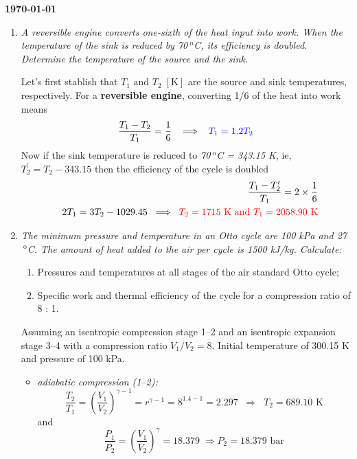 \documentclass[12pts,a4paper,amsmath,amssymb,floatfix]{article}%
\newcommand{\frc}{\displaystyle\frac}
\begin{document}
\begin{flushright}
{\bf \today}
\end{flushright}


\begin{enumerate}[label=\bfseries Example \arabic*]


\item {\it A reversible engine converts one-sixth of the heat input into work. When the temperature of the sink is reduced by 70$^{\text{ o}}$C, its efficiency is doubled. Determine the temperature of the source and the sink.}\label{Example_03_01}

Let's first stablish that $T_{1}\text{ and }T_{2}\;\left[\text{K}\right]$ are the source and sink temperatures, respectively. For a {\bf reversible engine}, converting 1/6 of the heat into work means
\begin{displaymath}
\frc{T_{1}-T_{2}}{T_{1}}=\frc{1}{6} \;\;\; \Longrightarrow \;\;\; \textcolor{blue}{T_{1}=1.2T_{2}}
\end{displaymath}
Now if the sink temperature is reduced to {\it 70$^{\text{ o}}$C = 343.15 K}, ie, $T_{2}^{\prime}=T_{2}-343.15$ then the efficiency of the cycle is doubled
\begin{eqnarray}
&& \frc{T_{1}-T_{2}^{\prime}}{T_{1}}=2\times\frc{1}{6} \nonumber \\
&& 2T_{1}=3T_{2}-1029.45\;\;\Longrightarrow\;\;\textcolor{red}{T_{2}=1715\text{ K and }T_{1}=2058.90\text{ K}}\nonumber
\end{eqnarray}



\item {\it The minimum pressure and temperature in an Otto cycle are 100 kPa and 27 $^{\text{ o}}$C. The amount of heat added to the air per cycle is 1500 kJ/kg. Calculate:
\begin{enumerate}
\item Pressures and temperatures at all stages of the air standard Otto cycle;
\item Specific  work and thermal efficiency of the cycle for a compression ratio of 8 : 1.
\end{enumerate}
}
Assuming an isentropic compression stage 1--2 and an isentropic expansion stage 3--4 with a compression ratio $V_{1}/V_{2}= 8$. Initial temperature of 300.15 K and pressure of 100 kPa.
\begin{itemize}
%
\item {\it adiabatic compression (1--2):}
\begin{displaymath}
  \frc{T_{2}}{T_{1}}=\left(\frc{V_{1}}{V_{2}}\right)^{\gamma-1}=r^{\gamma-1}=8^{1.4-1}=2.297\;\;\Longrightarrow\;\;T_{2}=689.10\text{ K}
\end{displaymath}
and
\begin{displaymath}
\frc{P_{1}}{P_{2}}=\left(\frc{V_{1}}{V_{2}}\right)^{\gamma}=18.379\;\Longrightarrow P_{2}=18.379\text{ bar}
\end{displaymath}


\end{itemize}
\end{enumerate}
\end{document}
